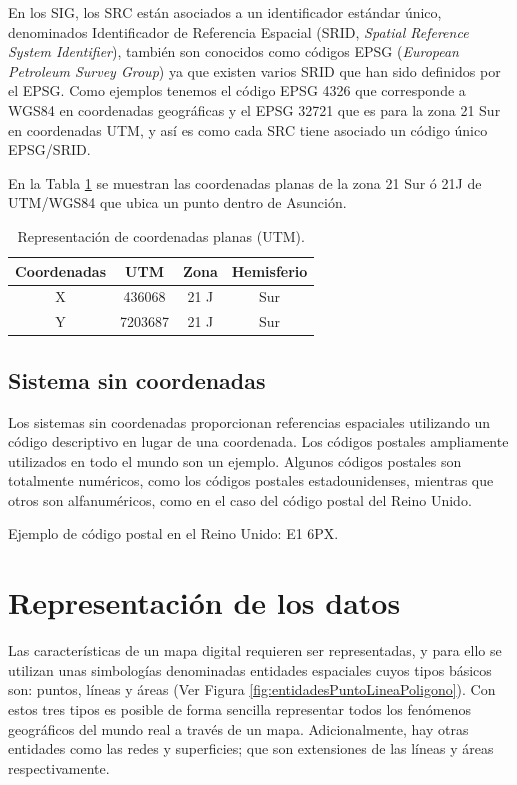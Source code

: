 En los SIG, los SRC están asociados a un identificador estándar único, denominados Identificador de Referencia Espacial (SRID, \textit{Spatial Reference System Identifier}), también son conocidos como códigos EPSG (\textit{European Petroleum Survey Group}) ya que existen varios SRID que han sido definidos por el EPSG. Como ejemplos tenemos el código EPSG 4326 que corresponde a WGS84 en coordenadas geográficas y el EPSG 32721 que es para la zona 21 Sur en coordenadas UTM, y así es como cada SRC tiene asociado un código único EPSG/SRID.

En la Tabla \ref{table:coordenadasPlanas} se muestran las coordenadas planas de la zona 21 Sur ó 21J de UTM/WGS84 que ubica un punto dentro de Asunción.

\begin{table}[H]
\caption{Representación de coordenadas planas (UTM).}
\centering
\begin{tabular}{cccc}
\hline
Coordenadas & UTM     & Zona & Hemisferio \\ \hline
X           & 436068  & 21 J & Sur        \\
Y           & 7203687 & 21 J & Sur        \\ \hline
\end{tabular}
\label{table:coordenadasPlanas}
\end{table}

\subsection{Sistema sin coordenadas}
Los sistemas sin coordenadas proporcionan referencias espaciales utilizando un código descriptivo en lugar de una coordenada. Los códigos postales ampliamente utilizados en todo el mundo son un ejemplo. Algunos códigos postales son totalmente numéricos, como los códigos postales estadounidenses, mientras que otros son alfanuméricos, como en el caso del código postal del Reino Unido.

Ejemplo de código postal en el Reino Unido: E1 6PX.

\section{Representación de los datos}

Las características de un mapa digital requieren ser representadas, y para ello se utilizan unas simbologías denominadas entidades espaciales cuyos tipos básicos son: puntos, líneas y áreas (Ver Figura \ref{fig:entidadesPuntoLineaPoligono}). Con estos tres tipos es posible de forma sencilla representar todos los fenómenos geográficos del mundo real a través de un mapa. Adicionalmente, hay otras entidades como las redes y superficies; que son extensiones de las líneas y áreas respectivamente.

